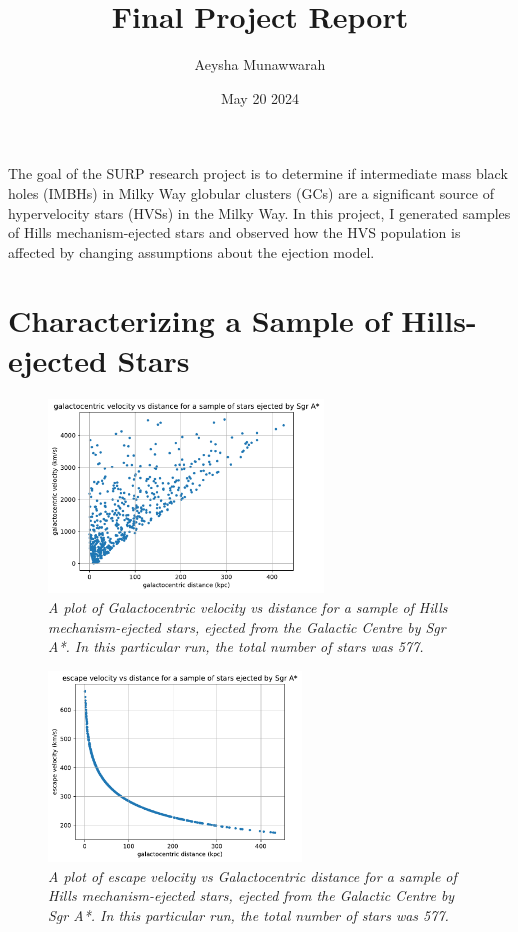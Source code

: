 \documentclass{article}
\title{Final Project Report}
\author{Aeysha Munawwarah}
\date{May 20 2024}
\begin{document}
\maketitle

The goal of the SURP research project is to determine if intermediate mass black holes (IMBHs) in Milky Way globular clusters (GCs) are a significant source of hypervelocity stars (HVSs) in the Milky Way. In this project, I generated samples of Hills mechanism-ejected stars and observed how the HVS population is affected by changing assumptions about the ejection model.

\section{Characterizing a Sample of Hills-ejected Stars}
\begin{figure}[h!]
\caption{\textit{A plot of Galactocentric velocity vs distance for a sample of Hills mechanism-ejected stars, ejected from the Galactic Centre by Sgr A*. In this particular run, the total number of stars was 577.}}
\centering
\includegraphics[width=0.65\textwidth]{GCv_vs_GCdist_1.pdf}
\end{figure}

\begin{figure}[h!]
\caption{\textit{A plot of escape velocity vs Galactocentric distance for a sample of Hills mechanism-ejected stars, ejected from the Galactic Centre by Sgr A*. In this particular run, the total number of stars was 577.}}
\centering
\includegraphics[width=0.6\textwidth]{Vesc_vs_GCdist.pdf}
\end{figure}
\end{document}

